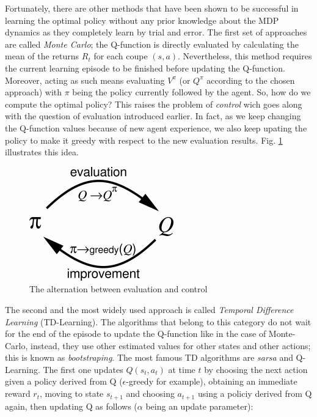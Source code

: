         Fortunately, there are other methods that have been shown to be successful in learning the optimal policy without any prior knowledge about the MDP dynamics as they completely learn by trial and error. The first set of approaches are called \textit{Monte Carlo}; the Q-function is directly evaluated by calculating the mean of the returns $R_t$ for each coupe $(s,a)$. Nevertheless, this method requires the current learning episode to be finished before updating the Q-function. Moreover, acting as such means evaluating $V^{\pi}$ (or $Q^{\pi}$ according to the chosen approach) with $\pi$ being the policy currently followed by the agent. So, how do we compute the optimal policy? This raises the problem of \textit{control} wich goes along with the question of evaluation introduced earlier. In fact, as we keep changing the Q-function values because of new agent experience, we also keep upating the policy to make it greedy with respect to the new evaluation results. Fig. \ref{fig:evalctrl} illustrates this idea.

        \begin{figure}
          \centering
          \includegraphics[scale=0.7]{figures/evalctrl.png}
          \caption{The alternation between evaluation and control}
          \label{fig:evalctrl}
        \end{figure}

        The second and the most widely used approach is called \textit{Temporal Difference Learning} (TD-Learning). The algorithms that belong to this category do not wait for the end of the episode to update the Q-function like in the case of Monte-Carlo, instead, they use other estimated values for other states and other actions; this is known as \textit{bootstraping}. The most famous TD algorithms are \textit{sarsa} and Q-Learning. The first one updates $Q(s_t,a_t)$ at time $t$ by choosing the next action given a policy derived from Q ($\epsilon$-greedy for example), obtaining an immediate reward $r_t$, moving to state $s_{t+1}$ and choosing $a_{t+1}$ using a policiy derived from Q again, then updating Q as follows ($\alpha$ being an update parameter):

